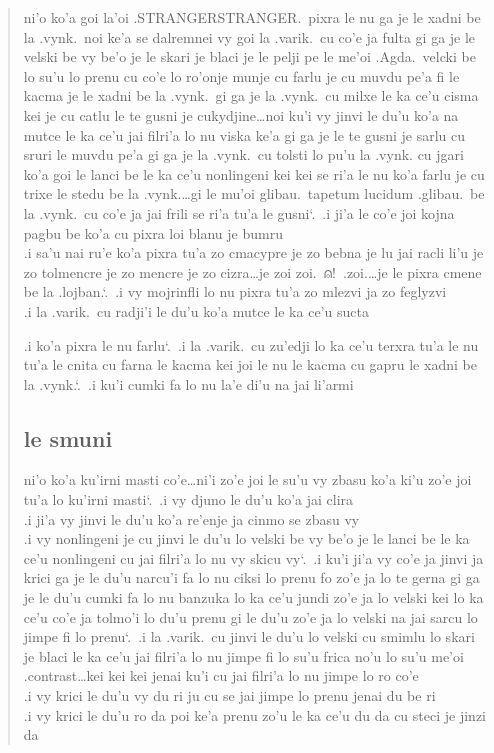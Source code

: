 \documentclass{report}
\newcommand\sds{\spacefactor\sfcode`.\ \space}
\begin{document}
\begin{quote}
	ni'o ko'a goi la'oi .STRANGERSTRANGER.\ pixra le nu ga je le xadni be la .vynk.\ noi ke'a se dalremnei vy goi la .varik.\ cu co'e ja fulta gi ga je le velski be vy be'o je le skari je blaci je le pelji pe le me'oi .Agda.\ velcki be lo su'u lo prenu cu co'e lo ro'onje munje cu farlu je cu muvdu pe'a fi le kacma je le xadni be la .vynk.\ gi ga je la .vynk.\ cu milxe le ka ce'u cisma kei je cu catlu le te gusni je cukydjine\ldots noi ku'i vy jinvi le du'u ko'a na mutce le ka ce'u jai filri'a lo nu viska ke'a gi ga je le te gusni je sarlu cu sruri le muvdu pe'a gi ga je la .vynk.\ cu tolsti lo pu'u la .vynk. cu jgari ko'a goi le lanci be le ka ce'u nonlingeni kei kei se ri'a le nu ko'a farlu je cu trixe le stedu be la .vynk.\ldots gi le mu'oi glibau.\ tapetum lucidum .glibau.\ be la .vynk.\ cu co'e ja jai frili se ri'a tu'a le gusni\sds  .i ji'a le co'e joi kojna pagbu be ko'a cu pixra loi blanu je bumru \\
.i sa'u nai ru'e ko'a pixra tu'a zo cmacypre je zo bebna je lu jai racli li'u je zo tolmencre je zo mencre je zo cizra\ldots je zoi zoi.\ ⍝!\ .zoi.\ldots je le pixra cmene be la .lojban.\sds  .i vy mojrinfli lo nu pixra tu'a zo mlezvi ja zo feglyzvi \\
.i la .varik.\ cu radji'i le du'u ko'a mutce le ka ce'u sucta

.i ko'a pixra le nu farlu\sds  .i la .varik.\ cu zu'edji lo ka ce'u terxra tu'a le nu tu'a le cnita cu farna le kacma kei joi le nu le kacma cu gapru le xadni be la .vynk.\sds  .i ku'i cumki fa lo nu la'e di'u na jai li'armi

	\subsection{le smuni}
	ni'o ko'a ku'irni masti co'e\ldots ni'i zo'e joi le su'u vy zbasu ko'a ki'u zo'e joi tu'a lo ku'irni masti\sds  .i vy djuno le du'u ko'a jai clira \\
	.i ji'a vy jinvi le du'u ko'a re'enje ja cinmo se zbasu vy \\
	.i vy nonlingeni je cu jinvi le du'u lo velski be vy be'o je le lanci be le ka ce'u nonlingeni cu jai filri'a lo nu vy skicu vy\sds  .i ku'i ji'a vy co'e ja jinvi ja krici ga je le du'u narcu'i fa lo nu ciksi lo prenu fo zo'e ja lo te gerna gi ga je le du'u cumki fa lo nu banzuka lo ka ce'u jundi zo'e ja lo velski kei lo ka ce'u co'e ja tolmo'i lo du'u prenu gi le du'u zo'e ja lo velski na jai sarcu lo jimpe fi lo prenu\sds  .i la .varik.\ cu jinvi le du'u lo velski cu smimlu lo skari je blaci le ka ce'u jai filri'a lo nu jimpe fi lo su'u frica no'u lo su'u me'oi .contrast\ldots kei kei kei jenai ku'i cu jai filri'a lo nu jimpe lo ro co'e \\
	.i vy krici le du'u vy du ri ju cu se jai jimpe lo prenu jenai du be ri \\
	.i vy krici le du'u ro da poi ke'a prenu zo'u le ka ce'u du da cu steci je jinzi da


\end{quote}
\end{document}
